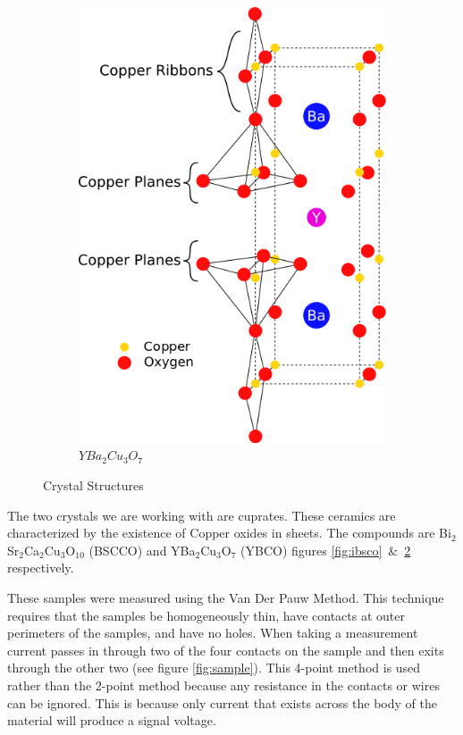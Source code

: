 \documentclass[
reprint,
amsmath,amssymb,
aps,
tikz,
border=5pt
]{revtex4-1}
\begin{document}
\begin{figure}
\begin{subfigure}{0.2\textwidth}
      \includegraphics[width = \textwidth]{figures/ybco.png}
      \caption{$YBa_2Cu_3O_7$}
      \label{fig:iybco}
    \end{subfigure}
    \caption{Crystal Structures}
  \end{figure}

  The two crystals we are working with are cuprates. These ceramics are characterized by the existence of Copper oxides in sheets. The compounds are Bi$_2$Sr$_2$Ca$_{2}$Cu$_3$O$_{10}$ (BSCCO) and YBa$_2$Cu$_3$O$_7$ (YBCO) figures \ref{fig:ibsco}~\&~\ref{fig:iybco} respectively. 
  
  These samples were measured using the Van Der Pauw Method. This technique requires that the samples be homogeneously thin, have contacts at outer perimeters of the samples, and have no holes. When taking a measurement current passes in through two of the four contacts on the sample and then exits through the other two (see figure \ref{fig:sample}). This 4-point method is used rather than the 2-point method because any resistance in the contacts or wires can be ignored. This is because only current that exists across the body of the material will produce a signal voltage.
\end{document}
